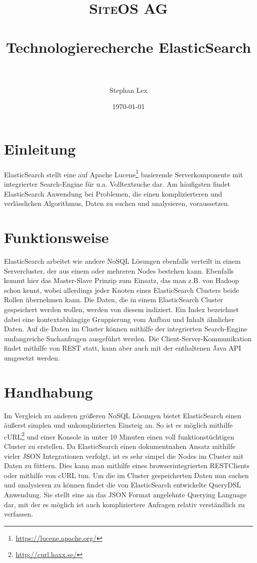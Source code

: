 \documentclass[paper=a4, fontsize=11pt]{scrartcl}
\title{	
\normalfont \normalsize 
\textsc{SiteOS AG} \\ [10pt] %
\horrule{0.5pt} \\[0.4cm] %
\huge Technologierecherche ElasticSearch \\ %
\horrule{2pt} \\[0.5cm] %
}
\author{Stephan Lex} %
\date{\normalsize\today} %
\begin{document}
\maketitle %



\section*{Einleitung}
ElasticSearch stellt eine auf Apache Lucene\footnote{\url{https://lucene.apache.org/}} basierende Serverkomponente mit integrierter Search-Engine für u.a. Volltextsuche dar. Am häufigsten findet ElasticSearch Anwendung bei Problemen, die einen komplizierteren und verlässlichen Algorithmus, Daten zu suchen und analysieren, voraussetzen. 

\section*{Funktionsweise}
ElasticSearch arbeitet wie andere NoSQL Lösungen ebenfalls verteilt in einem Servercluster, der aus einem oder mehreren Nodes bestehen kann.
Ebenfalls kommt hier das Master-Slave Prinzip zum Einsatz, das man z.B. von Hadoop schon kennt, wobei allerdings jeder Knoten eines ElasticSearch Clusters beide Rollen übernehmen kann. Die Daten, die in einem ElasticSearch Cluster gespeichert werden wollen, werden von diesem indiziert. Ein Index bezeichnet dabei eine kontextabhängige Gruppierung vom Aufbau und Inhalt ähnlicher Daten. Auf die Daten im Cluster können mithilfe der integrierten Search-Engine umfangreiche Suchanfragen ausgeführt werden. Die Client-Server-Kommunikation findet mithilfe von REST statt, kann aber auch mit der enthaltenen Java API umgesetzt werden. 

\section*{Handhabung}
Im Vergleich zu anderen größeren NoSQL Lösungen bietet ElasticSearch einen äußerst simplen und unkomplizierten Einsteig an. So ist es möglich mithilfe cURL\footnote{\url{http://curl.haxx.se/}} und einer Konsole in unter 10 Minuten einen voll funktionstüchtigen Cluster zu erstellen. Da ElasticSearch einen dokumentnahen Ansatz mithilfe vieler JSON Integrationen verfolgt, ist es sehr simpel die Nodes im Cluster mit Daten zu füttern. Dies kann man mithilfe eines browserintegrierten RESTClients oder mithilfe von cURL tun. 
Um die im Cluster gespeicherten Daten nun suchen und analysieren zu können findet die von ElasticSearch entwickelte QueryDSL Anwendung. Sie stellt eine an das JSON Format angelehnte Querying Language dar, mit der es möglich ist auch kompliziertere Anfragen relativ verständlich zu verfassen. 
\end{document}
